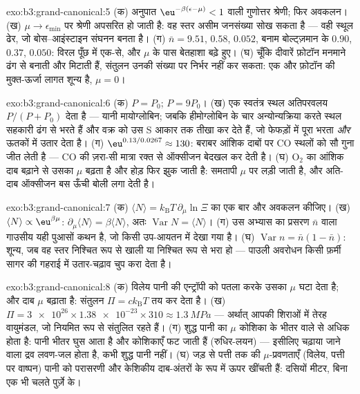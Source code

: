 \begin{solution}{exo:b3:grand-canonical:5}
(क) अनुपात $\eu^{-\beta(\epsilon-\mu)} < 1$ वाली गुणोत्तर श्रेणी;
फिर अवकलन। (ख) $\mu \to \epsilon_{\min}$ पर श्रेणी
अपसरित हो जाती है: वह स्तर असीम जनसंख्या सोख सकता है --- वही
स्थूल ढेर, जो बोस--आइंस्टाइन संघनन बनता है। (ग)
$\bar n = 9.51$, $0.58$, $0.052$, बनाम बोल्ट्ज़मान के $0.90$,
$0.37$, $0.050$: विरल पूँछ में एक-से, और $\mu$ के पास बेतहाशा
बढ़े हुए। (घ) चूँकि दीवारें फ़ोटॉन मनमाने ढंग से बनाती और मिटाती
हैं, संतुलन उनकी संख्या पर निर्भर नहीं कर सकता: एक और फ़ोटॉन की
मुक्त-ऊर्जा लागत शून्य है, $\mu = 0$।
\end{solution}

\begin{solution}{exo:b3:grand-canonical:6}
(क) $P = P_0$; $P = 9P_0$। (ख) एक स्वतंत्र स्थल
अतिपरवलय $P/(P + P_0)$ देता है --- यानी मायोग्लोबिन; जबकि
हीमोग्लोबिन के चार अन्योन्यक्रिया करते स्थल सहकारी ढंग से भरते हैं
और वक्र को उस S आकार तक तीखा कर देते हैं, जो फेफड़ों में पूरा भरता
\emph{और} ऊतकों में उतार देता है। (ग) $\eu^{0.13/0.0267} \approx 130$:
बराबर आंशिक दाबों पर CO स्थलों को सौ गुना जीत लेती है --- CO की
ज़रा-सी मात्रा रक्त से ऑक्सीजन बेदखल कर देती है। (घ) O$_2$ का
आंशिक दाब बढ़ाने से उसका $\mu$ बढ़ता है और होड़ फिर झुक जाती है:
समतापी $\mu$ पर लड़ी जाती है, और अति-दाब ऑक्सीजन बस ऊँची बोली लगा
देती है।
\end{solution}

\begin{solution}{exo:b3:grand-canonical:7}
(क) $\langle N\rangle = k_{\text{B}}T\,\partial_\mu
\ln\Xi$ का एक बार और अवकलन कीजिए। (ख) $\langle N\rangle \propto
\eu^{\beta\mu}$: $\partial_\mu\langle N\rangle = \beta\langle
N\rangle$, अतः $\operatorname{Var}N = \langle N\rangle$। (ग) उस
अभ्यास का प्रसरण $\bar n$ वाला गाउसीय यही पुआसों कथन है, जो किसी
उप-आयतन में देखा गया है। (घ) $\operatorname{Var}n =
\bar n(1 - \bar n)$: शून्य, जब वह स्तर निश्चित रूप से खाली या
निश्चित रूप से भरा हो --- पाउली अवरोधन किसी फ़र्मी सागर की गहराई में
उतार-चढ़ाव चुप करा देता है।
\end{solution}

\begin{solution}{exo:b3:grand-canonical:8}
(क) विलेय पानी की एन्ट्रॉपी को पतला करके उसका $\mu$ घटा देता है;
और दाब $\mu$ बढ़ाता है: संतुलन $\Pi = ck_{\text{B}}T$ तय कर देता
है। (ख) $\Pi =
\num{3e26} \times \num{1.38e-23} \times 310 \approx
\qty{1.3}{MPa}$ --- अर्थात् आपकी शिराओं में तेरह वायुमंडल, जो
नियमित रूप से संतुलित रहते हैं। (ग) शुद्ध पानी का $\mu$ कोशिका के
भीतर वाले से अधिक होता है: पानी भीतर घुस आता है और कोशिकाएँ फट
जाती हैं (रुधिर-लयन) --- इसीलिए चढ़ाया जाने वाला द्रव लवण-जल होता
है, कभी शुद्ध पानी नहीं। (घ) जड़ से पत्ती तक की
$\mu$-प्रवणताएँ (विलेय, पत्ती पर वाष्पन) पानी को परासरणी और केशिकीय
दाब-अंतरों के रूप में ऊपर खींचती हैं: दसियों मीटर, बिना एक भी
चलते पुर्ज़े के।
\end{solution}

